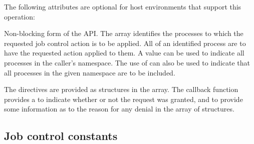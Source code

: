 
\reqattrend

\optattrstart
The following attributes are optional for host environments that support this operation:


\optattrend

\descr

Non-blocking form of the  \ac{API}.
The  array identifies the processes to which the requested job control action is to be applied. All  of an identified process are to have the requested action applied to them.
A  value can be used to indicate all processes in the caller's namespace.
The use of  can also be used to indicate that all processes in the given namespace are to be included.

The directives are provided as  structures in the  array.
The callback function provides a  to indicate whether or not the request was granted, and to provide some information as to the reason for any denial in the  array of  structures.

\subsection{Job control constants}
\label{api:struct:constants:jobcontrol}

